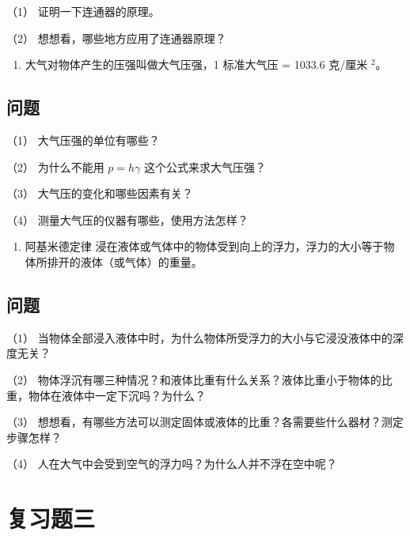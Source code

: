 （1） 证明一下连通器的原理。

（2） 想想看，哪些地方应用了连通器原理？

\begin{enumerate}
\def\labelenumi{\arabic{enumi}.}
\setcounter{enumi}{3}
\tightlist
\item
  大气对物体产生的压强叫做大气压强，1 标准大气压 = 1033.6 克/厘米
  \(^{2}\)。
\end{enumerate}

\subsection{问题}\label{ux95eeux9898-2}

（1） 大气压强的单位有哪些？

（2） 为什么不能用 \(p = h\gamma\) 这个公式来求大气压强？

（3） 大气压的变化和哪些因素有关？

（4） 测量大气压的仪器有哪些，使用方法怎样？

\begin{enumerate}
\def\labelenumi{\arabic{enumi}.}
\setcounter{enumi}{4}
\tightlist
\item
  阿基米德定律
  浸在液体或气体中的物体受到向上的浮力，浮力的大小等于物体所排开的液体（或气体）的重量。
\end{enumerate}

\subsection{问题}\label{ux95eeux9898-3}

（1）
当物体全部浸入液体中时，为什么物体所受浮力的大小与它浸没液体中的深度无关？

（2）
物体浮沉有哪三种情况？和液体比重有什么关系？液体比重小于物体的比重，物体在液体中一定下沉吗？为什么？

（3）
想想看，有哪些方法可以测定固体或液体的比重？各需要些什么器材？测定步骤怎样？

（4） 人在大气中会受到空气的浮力吗？为什么人并不浮在空中呢？

\section{复习题三}\label{ux590dux4e60ux9898ux4e09}

